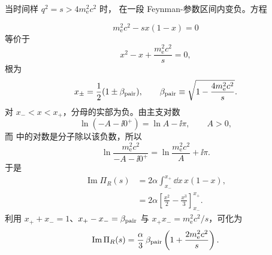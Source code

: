 \begin{derivation}
当时间样 $q^2=s>4m_{\mathrm e}^2c^2$ 时， 在一段 Feynman-参数区间内变负。方程

\begin{equation*}
 m_{\mathrm e}^2c^2-sx(1-x)=0
\end{equation*}
等价于
\begin{equation*}
 x^2-x+\frac{m_{\mathrm e}^2c^2}{s}=0,
\end{equation*}
根为
\begin{equation*}
 x_\pm=\frac12(1\pm\beta_{\rm pair}),
 \qquad
 \beta_{\rm pair}\equiv\sqrt{1-\frac{4m_{\mathrm e}^2c^2}{s}}.
\end{equation*}
对 $x_-<x<x_+$，分母的实部为负。由主支对数
\begin{equation*}
 \ln(-A-\ii0^+)=\ln A-\ii\pi,
 \qquad A>0,
\end{equation*}
而  中的对数是分子除以该负数，所以
\begin{equation*}
 \ln\frac{m_{\mathrm e}^2c^2}{-A-\ii0^+}
 =\ln\frac{m_{\mathrm e}^2c^2}{A}+\ii\pi.
\end{equation*}
于是
\begin{align*}
 \operatorname{Im}\Pi_R(s)
 &=2\alpha\int_{x_-}^{x_+}\dd x\,x(1-x),\\
 &=2\alpha\left[
 \frac{x^2}{2}-\frac{x^3}{3}
 \right]_{x_-}^{x_+}.
\end{align*}
利用 $x_++x_-=1$、$x_+-x_-=\beta_{\rm pair}$ 与 $x_+x_-=m_{\mathrm e}^2c^2/s$，可化为
\begin{equation*}
 {
 \operatorname{Im}\Pi_R(s)
 =\frac{\alpha}{3}\,
 \beta_{\rm pair}\left(1+\frac{2m_{\mathrm e}^2c^2}{s}\right).}
 \end{equation*}
\end{derivation}

